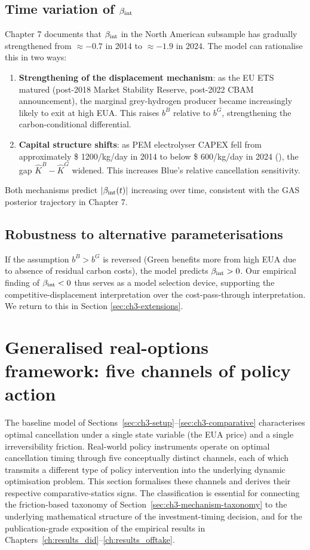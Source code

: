 \subsection{Time variation of $\beta_{\mathrm{int}}$}

Chapter 7 documents that $\beta_{\mathrm{int}}$ in the North American subsample has gradually strengthened from $\approx -0.7$ in 2014 to $\approx -1.9$ in 2024. The model can rationalise this in two ways:
\begin{enumerate}
    \item \textbf{Strengthening of the displacement mechanism}: as the EU ETS matured (post-2018 Market Stability Reserve, post-2022 CBAM announcement), the marginal grey-hydrogen producer became increasingly likely to exit at high EUA. This raises $b^B$ relative to $b^G$, strengthening the carbon-conditional differential.
    \item \textbf{Capital structure shifts}: as PEM electrolyser CAPEX fell from approximately \$ 1200/kg/day in 2014 to below \$ 600/kg/day in 2024 (\cite{iea2024hydrogen}), the gap $\hat{K}^B - \hat{K}^G$ widened. This increases Blue's relative cancellation sensitivity.
\end{enumerate}
Both mechanisms predict $|\beta_{\mathrm{int}}(t)|$ increasing over time, consistent with the GAS posterior trajectory in Chapter 7.

\subsection{Robustness to alternative parameterisations}

If the assumption $b^B > b^G$ is reversed (Green benefits more from high EUA due to absence of residual carbon costs), the model predicts $\beta_{\mathrm{int}} > 0$. Our empirical finding of $\beta_{\mathrm{int}} < 0$ thus serves as a model selection device, supporting the competitive-displacement interpretation over the cost-pass-through interpretation. We return to this in Section \ref{sec:ch3-extensions}.

\section{Generalised real-options framework: five channels of policy action}
\label{sec:ch3-five-channels}

The baseline model of Sections~\ref{sec:ch3-setup}--\ref{sec:ch3-comparative} characterises optimal cancellation under a single state variable (the EUA price) and a single irreversibility friction. Real-world policy instruments operate on optimal cancellation timing through five conceptually distinct channels, each of which transmits a different type of policy intervention into the underlying dynamic optimisation problem. This section formalises these channels and derives their respective comparative-statics signs. The classification is essential for connecting the friction-based taxonomy of Section~\ref{sec:ch3-mechanism-taxonomy} to the underlying mathematical structure of the investment-timing decision, and for the publication-grade exposition of the empirical results in Chapters~\ref{ch:results_did}--\ref{ch:results_offtake}.

